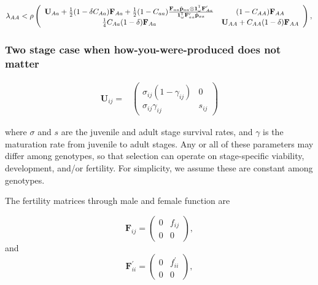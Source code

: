 \documentclass[11pt]{article}
\def\mbf#1{\mathbf{#1}}
\newcommand{\tr}{{\mbox{\tiny \sf T}}}
\begin{document}
\begin{equation} \label{eq:coexist_baa}
	\lambda_{AA} < 
			\rho\left(\begin{array}{cc}
\mathbf{U}_{Aa} + \frac{1}{2} (1 - \delta C_{Aa}) \mbf{F}_{Aa} +\frac{1}{2} (1 - C_{aa})\frac{\mbf{F}_{aa}\hat{\mbf{p}}_{aa}\otimes \mathbf{1}^\tr_{\omega} \mathbf{F}_{Aa}^\prime}{\mathbf{1}^\tr_\omega \mathbf{F}_{aa}^\prime \hat{\mathbf{p}}_{aa}	} & (1-C_{AA}) \mbf{F}_{AA} \\
\frac{1}{4} C_{Aa} (1 - \delta) \mbf{F}_{Aa}  &\mathbf{U}_{AA} +C_{AA} (1 - \delta) \mbf{F}_{AA}  \\ 
			\end{array} \right), \\ 
\end{equation} 

\subsubsection*{Two stage case when how-you-were-produced does not matter}


\begin{align*}
	\mbf{U}_{ij} = &\left(
					\begin{array}{cc}
						\sigma_{ij}(1 - \gamma_{ij}) & 0 \\
						\sigma_{ij} \gamma_{ij}     & s_{ij}
					\end{array}
				\right)  
\end{align*}

\noindent where $\sigma$ and $s$ are the juvenile and adult stage survival rates, and $\gamma$ is the maturation rate from juvenile to adult stages. Any or all of these parameters may differ among genotypes, so that selection can operate on stage-specific viability, development, and/or fertility. For simplicity, we assume these are constant among genotypes. 

The fertility matrices through male and female function are

\begin{equation}
	\mbf{F}_{ij} = \left(
					\begin{array}{cc}
						0 &  f_{ij} \\
						0 & 0
					\end{array}
				\right),
\end{equation}
\noindent and
\begin{equation}
	\mbf{F}^{\prime}_{ii} = \left(
					\begin{array}{cc}
						0 &  f^{\prime}_{ii} \\
						0 & 0
					\end{array}
				\right),
\end{equation}
\end{document}
